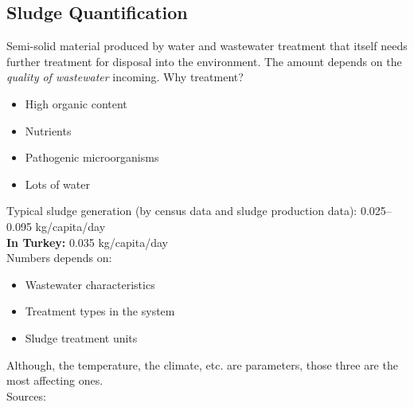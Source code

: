 \documentclass{article}
\numberwithin{equation}{section}
\begin{document}
\subsection{Sludge Quantification}
Semi-solid material produced by water and wastewater treatment that itself needs further treatment for disposal into the environment. The amount depends on the \emph{quality of wastewater} incoming.
Why treatment?
\begin{itemize}
    \item High organic content
    \item Nutrients
    \item Pathogenic microorganisms
    \item Lots of water
\end{itemize}
Typical sludge generation (by census data and sludge production data): 0.025--0.095 kg/capita/day\\
\textbf{In Turkey:} 0.035 kg/capita/day\\
Numbers depends on:
\begin{itemize}
    \item Wastewater characteristics
    \item Treatment types in the system
    \item Sludge treatment units
\end{itemize}
Although, the temperature, the climate, etc. are parameters, those three are the most affecting ones.\\
Sources:
\end{document}
